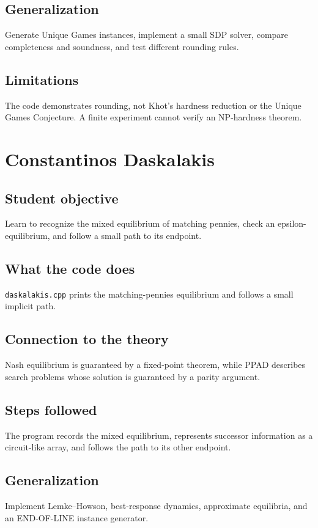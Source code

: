 \documentclass[11pt]{book}
\begin{document}
\section{Generalization}
Generate Unique Games instances, implement a small SDP solver, compare completeness and soundness, and test different rounding rules.

\section{Limitations}
The code demonstrates rounding, not Khot's hardness reduction or the Unique Games Conjecture. A finite experiment cannot verify an NP-hardness theorem.

\chapter{Constantinos Daskalakis}
\section{Student objective}
Learn to recognize the mixed equilibrium of matching pennies, check an epsilon-equilibrium, and follow a small path to its endpoint.
\section{What the code does}
\texttt{daskalakis.cpp} prints the matching-pennies equilibrium and follows a small implicit path.

\section{Connection to the theory}
Nash equilibrium is guaranteed by a fixed-point theorem, while PPAD describes search problems whose solution is guaranteed by a parity argument.

\section{Steps followed}
The program records the mixed equilibrium, represents successor information as a circuit-like array, and follows the path to its other endpoint.

\section{Generalization}
Implement Lemke--Howson, best-response dynamics, approximate equilibria, and an END-OF-LINE instance generator.
\end{document}
